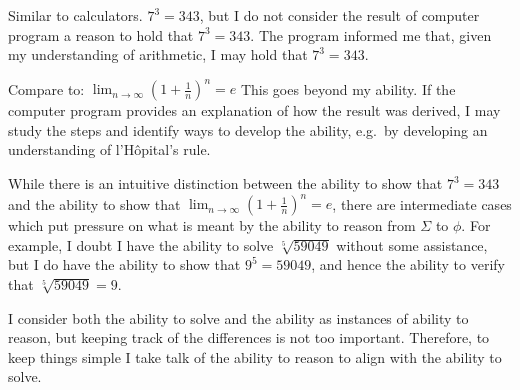 \documentclass[10pt]{article}
\begin{document}
\begin{note}
  Similar to calculators.
  \(7^{3} = 343\), but I do not consider the result of computer program a reason to hold that \(7^{3} = 343\).
  The program informed me that, given my understanding of arithmetic, I may hold that \(7^{3} = 343\).

  Compare to:
  \(\lim_{n \to \infty}\left(1 + \frac{1}{n} \right)^{n} = e\)
  This goes beyond my ability.
  If the computer program provides an explanation of how the result was derived, I may study the steps and identify ways to develop the ability, e.g.\ by developing an understanding of l'H\^{o}pital's rule.

  While there is an intuitive distinction between the ability to show that \(7^{3} = 343\) and the ability to show that \(\lim_{n \to \infty}\left(1 + \frac{1}{n} \right)^{n} = e\), there are intermediate cases which put pressure on what is meant by the ability to reason from \(\Sigma\) to \(\phi\).
  For example, I doubt I have the ability to solve \(\sqrt[5]{59049}\) without some assistance, but I do have the ability to show that \(9^{5} = 59049\), and hence the ability to verify that \(\sqrt[5]{59049} = 9\).

  I consider both the ability to solve and the ability as instances of ability to reason, but keeping track of the differences is not too important.
  Therefore, to keep things simple I take talk of the ability to reason to align with the ability to solve.
\end{note}
\end{document}
